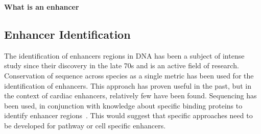         


	
        \textbf{What is an enhancer}
        


        
        \subsection{Enhancer Identification}
        
        The identification of enhancers regions in DNA has been a subject of intense study since their discovery in the late 70s and is an active field of research.
        Conservation of sequence across species as a single metric has been used for the identification of enhancers. This approach has proven useful in the past, but in the context of cardiac enhancers, relatively few have been found. Sequencing has been used, in conjunction with knowledge about specific binding proteins to identify enhancer regions~\cite{blow2010chip}. This would suggest that specific approaches need to be developed for pathway or cell specific enhancers. 
        

